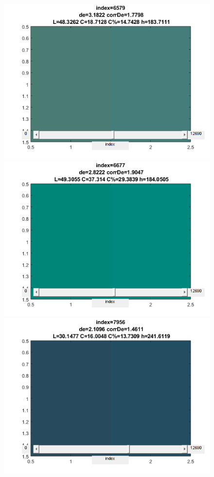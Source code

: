 \begin{figure}[!ht]
\begin{center}
	\includegraphics[scale=0.5]{images/6579.png}
	\includegraphics[scale=0.5]{images/6677.png}
	\includegraphics[scale=0.5]{images/7956.png}

\end{center}
\end{figure}
